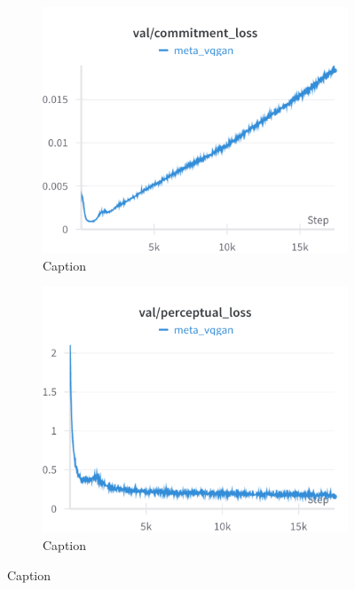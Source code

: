 \begin{figure}[H]
\hfill
\hfill
\begin{subfigure}[h]{.45\linewidth}
    \includegraphics[width=\linewidth]{detailed_engineering/Meta VQGAN/charts/val_commitment_loss.png}
    \caption{Caption}
    \label{fig:enter-label}
\end{subfigure}
\hfill
\begin{subfigure}[h]{.45\linewidth}
    \includegraphics[width=\linewidth]{detailed_engineering/Meta VQGAN/charts/val_perceptual_loss.png}
    \caption{Caption}
    \label{fig:enter-label}
\end{subfigure}
\end{figure}


